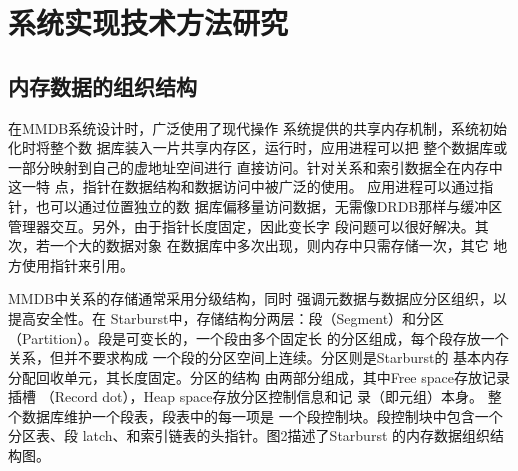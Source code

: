 \documentclass[literaturereview]{zjutreport}
\begin{document}
\begin{table}[htbp]
\caption{主流内存数据库}\label{tab:table2}
\vspace{\baselineskip}
\end{table}

\chapter{系统实现技术方法研究}
\section{内存数据的组织结构}
在MMDB系统设计时，广泛使用了现代操作
系统提供的共享内存机制，系统初始化时将整个数
据库装入一片共享内存区，运行时，应用进程可以把
整个数据库或一部分映射到自己的虚地址空间进行
直接访问。针对关系和索引数据全在内存中这一特
点，指针在数据结构和数据访问中被广泛的使用。
应用进程可以通过指针，也可以通过位置独立的数
据库偏移量访问数据，无需像DRDB那样与缓冲区
管理器交互。另外，由于指针长度固定，因此变长字
段问题可以很好解决。其次，若一个大的数据对象
在数据库中多次出现，则内存中只需存储一次，其它
地方使用指针来引用。

MMDB中关系的存储通常采用分级结构，同时
强调元数据与数据应分区组织，以提高安全性。在
Starburst中，存储结构分两层：段（Segment）和分区
（Partition）。段是可变长的，一个段由多个固定长
的分区组成，每个段存放一个关系，但并不要求构成
一个段的分区空间上连续。分区则是Starburst的
基本内存分配回收单元，其长度固定。分区的结构
由两部分组成，其中Free space存放记录插槽
（Record dot），Heap space存放分区控制信息和记
录（即元组）本身。
整个数据库维护一个段表，段表中的每一项是
一个段控制块。段控制块中包含一个分区表、段
latch、和索引链表的头指针。图2描述了Starburst
的内存数据组织结构图。
\end{document}
